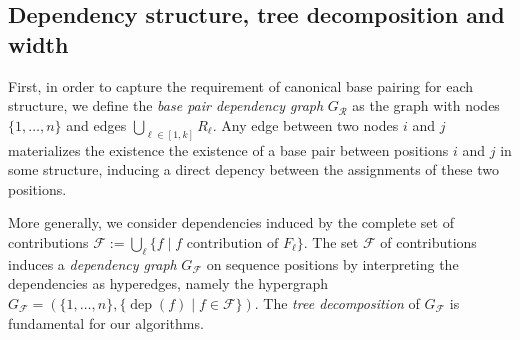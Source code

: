 \documentclass[twocolumn]{bmcart}%
\newcommand{\dep}{\operatorname{dep}}
\newcommand{\B}{\mathcal{B}}
\newcommand{\F}{\mathcal{F}}
\newcommand{\R}{\mathcal{R}}
\newcommand{\EbpSym}{E^{\textrm{bp}}}
\newcommand{\Def}[1]{\emph{#1}}
\newcommand{\Nuc}[1]{{\sf #1}}
\newcommand{\Ab}{\Nuc{A}}
\newcommand{\Cb}{\Nuc{C}}
\newcommand{\Gb}{\Nuc{G}}
\newcommand{\Ub}{\Nuc{U}}
\newcommand{\citep}[1]{\cite{#1}}
\begin{document}

\subsection*{Dependency structure, tree decomposition and width}





First, in order to capture the requirement of canonical base pairing for each structure,
we define the \Def{base pair dependency graph} $G_{\R}$ as the graph with nodes $\{1,\dots,n\}$
and edges $\bigcup_{\ell\in[1,k]} R_\ell$. Any edge between two nodes $i$ and $j$ materializes the existence the existence of a base pair between positions $i$ and $j$ in some structure, inducing a direct depency between the assignments of these two positions.

More generally, we consider dependencies induced by the complete set of contributions $\F := \bigcup_{\ell}\{f\mid f\text{ contribution of } F_\ell\}$.
%
%
The set $\F$ of contributions induces a
  \Def{dependency graph} $G_\F$ on sequence positions by interpreting the dependencies as hyperedges, namely the hypergraph 
  $G_\F=(\{1,\dots,n\} ,\{\dep(f)\mid f\in \F\})$. The \Def{tree decomposition} of $G_\F$ is fundamental for our algorithms.
\end{document}
